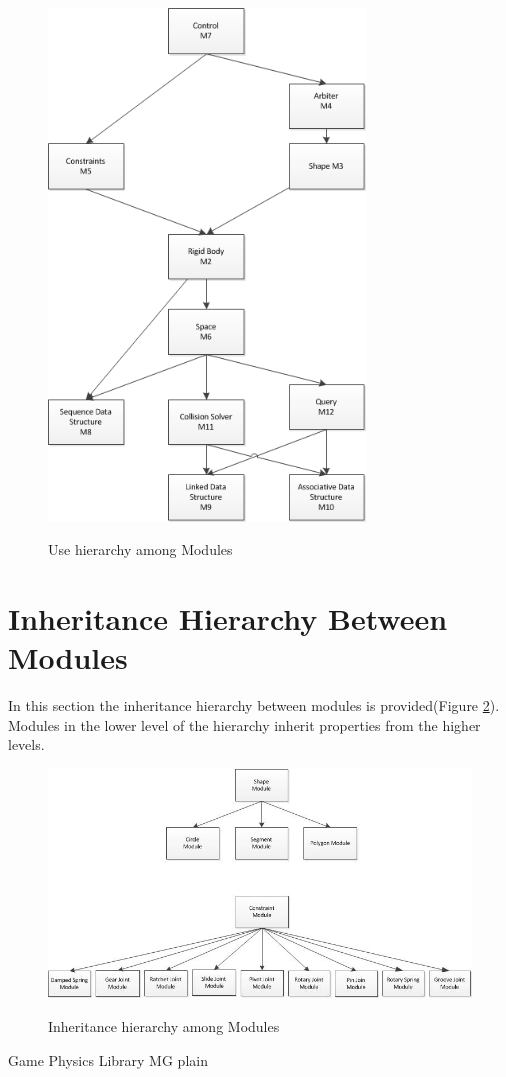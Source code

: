 \documentclass[12pt]{article}
\begin{document}
\begin{figure}[htbp]
\begin{center}
{
 \includegraphics[width=0.75\textwidth]{uses.png}
}
\caption{\label{Fig_uses}Use hierarchy among Modules}
\end{center}
\end{figure}


\section{Inheritance Hierarchy Between Modules} \label{SecInheritance}
In this section the inheritance hierarchy between modules is provided(Figure \ref{Fig_Inheritance}).
Modules in the lower level of the hierarchy inherit properties from the higher levels.
\begin{figure}[htbp]
\begin{center}
{
 \includegraphics[width=1\textwidth]{inherit.png}
}
\caption{\label{Fig_Inheritance}Inheritance hierarchy among Modules}
\end{center}
\end{figure}



 {Game Physics Library MG}{}
 {plain}
\end{document}
